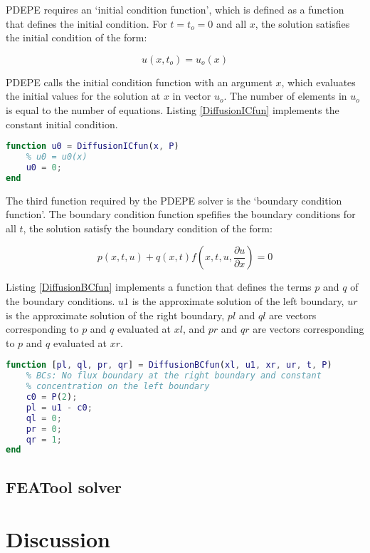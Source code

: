 \documentclass{article}
\begin{document}
PDEPE requires an `initial condition function', which is defined as a function that defines the initial condition. For $t = t_o = 0$ and all $x$, the solution satisfies the initial condition of the form:

$$ u(x, t_o) = u_o(x) $$

PDEPE calls the initial condition function with an argument $x$, which evaluates the initial values for the solution at $x$ in vector $u_o$. The number of elements in $u_o$ is equal to the number of equations. Listing \ref{DiffusionICfun} implements the constant initial condition.

\begin{lstlisting}[language=Matlab, caption=Initial condition function, label=DiffusionICfun]
function u0 = DiffusionICfun(x, P)
    % u0 = u0(x)
    u0 = 0;
end
\end{lstlisting}

The third function required by the PDEPE solver is the `boundary condition function'. The boundary condition function spefifies the boundary conditions for all $t$, the solution satisfy the boundary condition of the form:

$$ p(x, t, u) + q(x, t) f \left( x, t, u, \frac{\partial u}{\partial x} \right) = 0 $$

Listing \ref{DiffusionBCfun} implements a function that defines the terms $p$ and $q$ of the boundary conditions. $u1$ is the approximate solution of the left boundary, $ur$ is the approximate solution of the right boundary, $pl$ and $ql$ are vectors corresponding to $p$ and $q$ evaluated at $xl$, and $pr$ and $qr$ are vectors corresponding to $p$ and $q$ evaluated at $xr$.

\begin{lstlisting}[language=Matlab, caption=Boundary condition function, label=DiffusionBCfun]
function [pl, ql, pr, qr] = DiffusionBCfun(xl, u1, xr, ur, t, P)
    % BCs: No flux boundary at the right boundary and constant
    % concentration on the left boundary
    c0 = P(2);
    pl = u1 - c0;
    ql = 0;
    pr = 0;
    qr = 1;
end
\end{lstlisting}

\subsection{FEATool solver}

\section{Discussion}

\printbibliography[title={References}]
\end{document}
